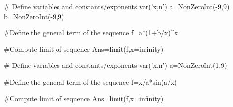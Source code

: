 
\begin{sagesilent}
# Define variables and constants/exponents
var('x,n')
a=NonZeroInt(-9,9)
b=NonZeroInt(-9,9)


#Define the general term of the sequence
f=a*(1+b/x)^x

#Compute limit of sequence
Ans=limit(f,x=infinity)

\end{sagesilent}


\begin{sagesilent}
# Define variables and constants/exponents
var('x,n')
a=NonZeroInt(1,9)


#Define the general term of the sequence
f=x/a*sin(a/x)

#Compute limit of sequence
Ans=limit(f,x=infinity)

\end{sagesilent}

